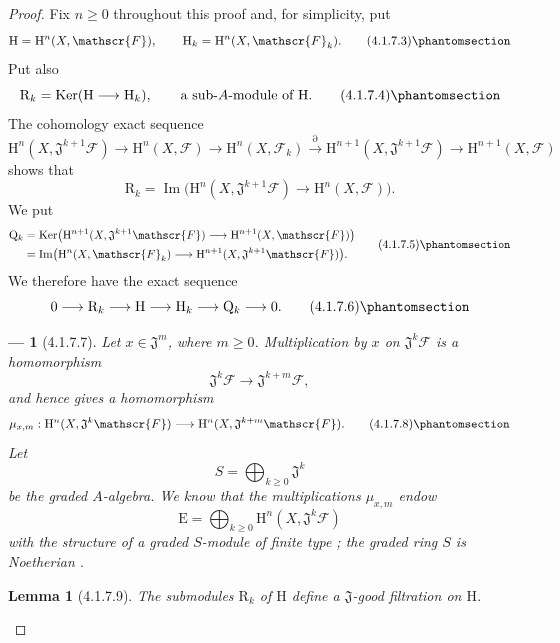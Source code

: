 \documentclass[oneside]{amsart}
\theoremstyle{ega-env-style}
\newtheorem*{env}{---}
\theoremstyle{ega-thm-env-style}
\newtheorem*{lemma}{Lemma}
\theoremstyle{ega-defn-env-style}
\def\mathcal{\mathscr}
\def\sh{\mathcal}                   %
\def\geq{\geqslant}                 %
\def\HH{\mathrm{H}}                 %
\def\Ker{\operatorname{Ker}}
\def\Im{\operatorname{Im}}
\let\EGAOriginalLabel\label
\renewcommand{\label}[1]{\phantomsection\EGAOriginalLabel{#1}}
\begin{document}
\begin{proof}
Fix $n\geq0$ throughout this proof and, for simplicity, put
\[
  \mathrm{H}=\HH^n(X,\sh{F}),
  \qquad
  \mathrm{H}_k=\HH^n(X,\sh{F}_k).
  \tag{4.1.7.3}
  \label{III.4.1.7.3}
\]
Put also
\[
  \mathrm{R}_k
  =
  \Ker(\mathrm{H}\longrightarrow\mathrm{H}_k),
  \qquad
  \text{a sub-$A$-module of $\mathrm{H}$.}
  \tag{4.1.7.4}
  \label{III.4.1.7.4}
\]
The cohomology exact sequence
\[
  \HH^n(X,\mathfrak{J}^{k+1}\sh{F})
  \longrightarrow
  \HH^n(X,\sh{F})
  \longrightarrow
  \HH^n(X,\sh{F}_k)
  \xrightarrow{\partial}
  \HH^{n+1}(X,\mathfrak{J}^{k+1}\sh{F})
  \longrightarrow
  \HH^{n+1}(X,\sh{F})
\]
shows that
\[
  \mathrm{R}_k
  =
  \Im\bigl(
    \HH^n(X,\mathfrak{J}^{k+1}\sh{F})
    \longrightarrow
    \HH^n(X,\sh{F})
  \bigr).
\]
We put
\[
  \begin{split}
  \mathrm{Q}_k
  &=
  \Ker\bigl(
    \HH^{n+1}(X,\mathfrak{J}^{k+1}\sh{F})
    \longrightarrow
    \HH^{n+1}(X,\sh{F})
  \bigr)
  \\
  &=
  \Im\bigl(
    \HH^n(X,\sh{F}_k)
    \longrightarrow
    \HH^{n+1}(X,\mathfrak{J}^{k+1}\sh{F})
  \bigr).
  \end{split}
  \tag{4.1.7.5}
  \label{III.4.1.7.5}
\]
We therefore have the exact sequence
\[
  0\longrightarrow\mathrm{R}_k
  \longrightarrow\mathrm{H}
  \longrightarrow\mathrm{H}_k
  \longrightarrow\mathrm{Q}_k
  \longrightarrow0.
  \tag{4.1.7.6}
  \label{III.4.1.7.6}
\]

\begin{env}[4.1.7.7]
\label{III.4.1.7.7}
Let $x\in\mathfrak{J}^m$, where $m\geq0$.
Multiplication by $x$ on $\mathfrak{J}^k\sh{F}$ is a homomorphism
\[
  \mathfrak{J}^k\sh{F}
  \longrightarrow
  \mathfrak{J}^{k+m}\sh{F},
\]
and hence gives a homomorphism
\[
  \mu_{x,m}:
  \HH^n(X,\mathfrak{J}^k\sh{F})
  \longrightarrow
  \HH^n(X,\mathfrak{J}^{k+m}\sh{F}).
  \tag{4.1.7.8}
  \label{III.4.1.7.8}
\]
Let
\[
  S=\bigoplus_{k\geq0}\mathfrak{J}^k
\]
be the graded $A$-algebra.
We know that the multiplications $\mu_{x,m}$ endow
\[
  \mathrm{E}
  =
  \bigoplus_{k\geq0}
  \HH^n(X,\mathfrak{J}^k\sh{F})
\]
with the structure of a graded $S$-module of finite type
; the graded ring $S$ is Noetherian
.
\end{env}

\begin{lemma}[4.1.7.9]
\label{III.4.1.7.9}
The submodules $\mathrm{R}_k$ of $\mathrm{H}$ define a
$\mathfrak{J}$-good filtration on $\mathrm{H}$.
\end{lemma}


\end{proof}
\end{document}
